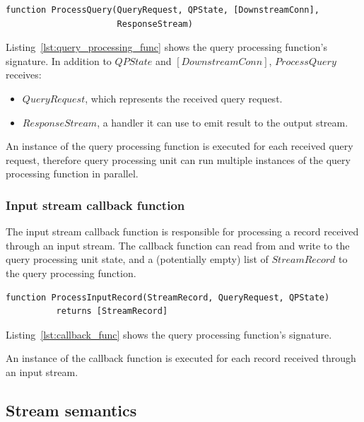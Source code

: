 \todo{}
\begin{lstlisting}[caption={Query processing function signature},captionpos=b,label={lst:query_processing_func}]
function ProcessQuery(QueryRequest, QPState, [DownstreamConn],
                      ResponseStream)
\end{lstlisting}

\noindent
\begin{sloppypar}
Listing~\ref{lst:query_processing_func} shows the query processing function's signature.
In addition to $QPState$ and $[DownstreamConn]$, $ProcessQuery$ receives:
\end{sloppypar}
\begin{itemize}
  \item $QueryRequest$, which represents the received query request.

  \item $ResponseStream$, a handler it can use to emit result to the output stream.

\end{itemize}

An instance of the query processing function is executed for each received query request,
therefore query processing unit can run multiple instances of the query processing function in parallel.

\subsubsection{Input stream callback function}
\label{sec:callback_func}

The input stream callback function is responsible for processing a record received through an input stream.
The callback function can read from and write to the query processing unit state,
and a (potentially empty) list of $StreamRecord$ to the query processing function.

\todo{}
\begin{lstlisting}[caption={Input stream callback function signature},captionpos=b,label={lst:callback_func}]
function ProcessInputRecord(StreamRecord, QueryRequest, QPState)
          returns [StreamRecord]
\end{lstlisting}

\noindent
Listing~\ref{lst:callback_func} shows the query processing function's signature.

An instance of the callback function is executed for each record received through an input stream.

\subsection{Stream semantics}

